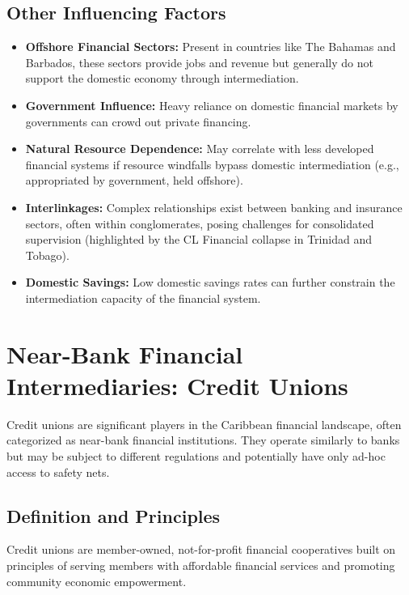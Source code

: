 \subsection{Other Influencing Factors}
\begin{itemize}
    \item \textbf{Offshore Financial Sectors:} Present in countries like The Bahamas and Barbados, these sectors provide jobs and revenue but generally do not support the domestic economy through intermediation.
    \item \textbf{Government Influence:} Heavy reliance on domestic financial markets by governments can crowd out private financing.
    \item \textbf{Natural Resource Dependence:} May correlate with less developed financial systems if resource windfalls bypass domestic intermediation (e.g., appropriated by government, held offshore).
    \item \textbf{Interlinkages:} Complex relationships exist between banking and insurance sectors, often within conglomerates, posing challenges for consolidated supervision (highlighted by the CL Financial collapse in Trinidad and Tobago).
    \item \textbf{Domestic Savings:} Low domestic savings rates can further constrain the intermediation capacity of the financial system.
\end{itemize}

\section{Near-Bank Financial Intermediaries: Credit Unions}

Credit unions are significant players in the Caribbean financial landscape, often categorized as near-bank financial institutions. They operate similarly to banks but may be subject to different regulations and potentially have only ad-hoc access to safety nets.

\subsection{Definition and Principles}
Credit unions are member-owned, not-for-profit financial cooperatives built on principles of serving members with affordable financial services and promoting community economic empowerment.

